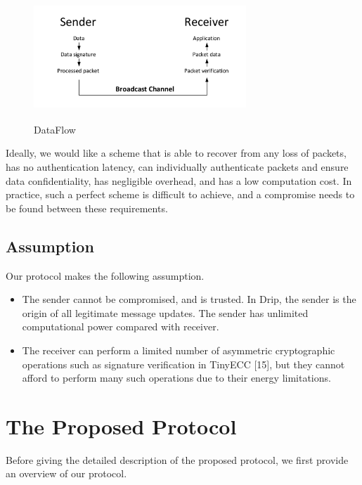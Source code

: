 \documentclass{sig-alternate-05-2015}
\begin{document}
\begin{figure}
\centering
\includegraphics[width=8cm,height=4cm]{DataFlow.pdf}\\
\caption{DataFlow}\label{} 
\end{figure}

Ideally, we would like a scheme that is able to recover from any loss of packets, has no authentication latency, can individually authenticate packets and ensure data confidentiality, has negligible overhead, and has a low computation cost. In practice, such a perfect scheme is difficult to achieve, and a compromise needs to be found between these requirements.
\subsection{Assumption}
Our protocol makes the following assumption.
\begin{itemize}
    \item The sender cannot be compromised, and is trusted. In Drip, the sender is the origin of all legitimate message updates. The sender has unlimited computational power compared with receiver.
    \item  The receiver can perform a limited number of asymmetric cryptographic operations such as signature verification in TinyECC [15], but they cannot afford to perform many such operations due to their energy limitations.
\end{itemize}
\section{The Proposed Protocol}
Before giving the detailed description of the proposed protocol, we first provide an overview of our protocol.
\end{document}
